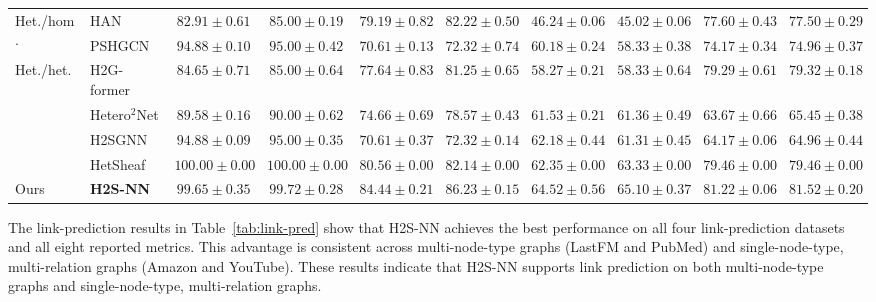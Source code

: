 \documentclass[sigconf,anonymous,review]{acmart}
\newcommand{\method}{\textsc{H2S-NN}}
\begin{document}
\begin{table}[htbp]
{\begin{tabular}{llcccccccc}
    \multirow{2}{*}{Het./hom.}
    & HAN
    & $82.91 \pm 0.61$
    & $85.00 \pm 0.19$
    & $79.19 \pm 0.82$
    & $82.22 \pm 0.50$
    & $46.24 \pm 0.06$
    & $45.02 \pm 0.06$
    & $77.60 \pm 0.43$
    & $77.50 \pm 0.29$ \\

    & PSHGCN
    & $94.88 \pm 0.10$
    & $95.00 \pm 0.42$
    & $70.61 \pm 0.13$
    & $72.32 \pm 0.74$
    & $60.18 \pm 0.24$
    & $58.33 \pm 0.38$
    & $74.17 \pm 0.34$
    & $74.96 \pm 0.37$ \\
    \midrule

    \multirow{4}{*}{Het./het.}
    & H2G-former
    & $84.65 \pm 0.71$
    & $85.00 \pm 0.64$
    & $77.64 \pm 0.83$
    & $81.25 \pm 0.65$
    & $58.27 \pm 0.21$
    & $58.33 \pm 0.64$
    & $79.29 \pm 0.61$
    & $79.32 \pm 0.18$ \\

    & Hetero$^2$Net
    & $89.58 \pm 0.16$
    & $90.00 \pm 0.62$
    & $74.66 \pm 0.69$
    & $78.57 \pm 0.43$
    & $61.53 \pm 0.21$
    & $61.36 \pm 0.49$
    & $63.67 \pm 0.66$
    & $65.45 \pm 0.38$ \\

    & H2SGNN
    & $94.88 \pm 0.09$
    & $95.00 \pm 0.35$
    & $70.61 \pm 0.37$
    & $72.32 \pm 0.14$
    & $62.18 \pm 0.44$
    & $61.31 \pm 0.45$
    & $64.17 \pm 0.06$
    & $64.96 \pm 0.44$ \\

    & HetSheaf
    & $\mathbf{100.00 \pm 0.00}$
    & $\mathbf{100.00 \pm 0.00}$
    & $80.56 \pm 0.00$
    & $82.14 \pm 0.00$
    & $62.35 \pm 0.00$
    & $63.33 \pm 0.00$
    & $79.46 \pm 0.00$
    & $79.46 \pm 0.00$ \\

    \midrule

    Ours
    & \textbf{\method{}}
    & $\mathbf{99.65 \pm 0.35}$
    & $\mathbf{99.72 \pm 0.28}$
    & $\mathbf{84.44 \pm 0.21}$
    & $\mathbf{86.23 \pm 0.15}$
    & $\mathbf{64.52 \pm 0.56}$
    & $\mathbf{65.10 \pm 0.37}$
    & $\mathbf{81.22 \pm 0.06}$
    & $\mathbf{81.52 \pm 0.20}$ \\
    \bottomrule
  \end{tabular}%
  }
\end{table}

The link-prediction results in Table~\ref{tab:link-pred} show that \method{} achieves the best performance on all four link-prediction datasets and all eight reported metrics. This advantage is consistent across multi-node-type graphs (LastFM and
PubMed) and single-node-type, multi-relation graphs (Amazon and YouTube). These results indicate that \method{} supports link prediction on both multi-node-type graphs and single-node-type, multi-relation graphs.
\end{document}

